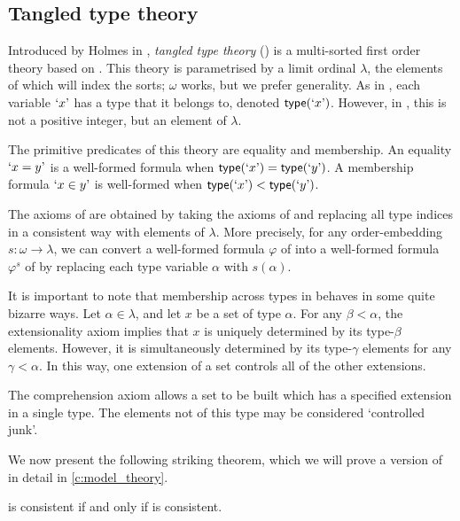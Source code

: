 \subsection{Tangled type theory}
\label{ss:theories:ttt}

Introduced by Holmes in \cite{holmes-ttt}, \emph{tangled type theory} ({\TTT}) is a multi-sorted first order theory based on {\TST}.
This theory is parametrised by a limit ordinal \( \lambda \), the elements of which will index the sorts; \( \omega \) works, but we prefer generality.
As in {\TST}, each variable \( \mquote{x} \) has a type that it belongs to, denoted \( \ttype(\mquote x) \).
However, in {\TTT}, this is not a positive integer, but an element of \( \lambda \).

The primitive predicates of this theory are equality and membership.
An equality \( \mquote{x = y} \) is a well-formed formula when \( \ttype(\mquote{x}) = \ttype(\mquote{y}) \).
A membership formula \( \mquote{x \in y} \) is well-formed when \( \ttype(\mquote{x}) < \ttype(\mquote{y}) \).

The axioms of {\TTT} are obtained by taking the axioms of {\TST} and replacing all type indices in a consistent way with elements of \( \lambda \).
More precisely, for any order-embedding \( s : \omega \to \lambda \), we can convert a well-formed formula \( \varphi \) of {\TST} into a well-formed formula \( \varphi^s \) of {\TTT} by replacing each type variable \( \alpha \) with \( s(\alpha) \).

It is important to note that membership across types in {\TTT} behaves in some quite bizarre ways.
Let \( \alpha \in \lambda \), and let \( x \) be a set of type \( \alpha \).
For any \( \beta < \alpha \), the extensionality axiom implies that \( x \) is uniquely determined by its type-\( \beta \) elements.
However, it is simultaneously determined by its type-\( \gamma \) elements for any \( \gamma < \alpha \).
In this way, one extension of a set controls all of the other extensions.

The comprehension axiom allows a set to be built which has a specified extension in a single type.
The elements not of this type may be considered `controlled junk'.

We now present the following striking theorem, which we will prove a version of in detail in \cref{c:model_theory}.

\begin{theorem*}[Holmes]
	{\NF} is consistent if and only if {\TTT} is consistent. \cite{holmes-ttt}
\end{theorem*}

